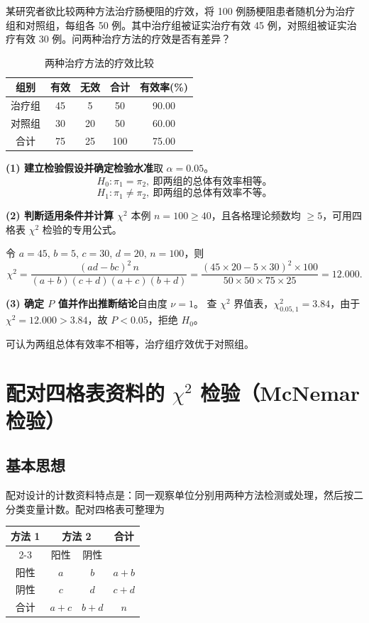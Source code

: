 \documentclass[lang=cn,10pt]{elegantbook}
\begin{document}
\vspace{0.2cm}
\begin{exercise}
某研究者欲比较两种方法治疗肠梗阻的疗效，将 100 例肠梗阻患者随机分为治疗组和对照组，每组各 50 例。其中治疗组被证实治疗有效 45 例，对照组被证实治疗有效 30 例。问两种治疗方法的疗效是否有差异？

\begin{table}[htbp]
\centering
\caption*{两种治疗方法的疗效比较}
\begin{tabular}{ccccc}
  \hline
  组别 & 有效 & 无效 & 合计 & 有效率(\%) \\
  \hline
  治疗组 & 45 & 5  & 50 & 90.00 \\
  对照组 & 30 & 20 & 50 & 60.00 \\
  \hline
  合计 & 75 & 25 & 100 & 75.00 \\
  \hline
\end{tabular}
\end{table}
\end{exercise}

\begin{solution}
\textbf{(1) 建立检验假设并确定检验水准}\quad 取 $\alpha=0.05$。
\[
  H_0:\pi_1=\pi_2,~即两组的总体有效率相等。
\]
\[
H_1:\pi_1\ne\pi_2,~即两组的总体有效率不等。
\]

\textbf{(2) 判断适用条件并计算 $\chi^2$}\quad
本例 $n=100\ge 40$，且各格理论频数均 $\ge 5$，可用四格表 $\chi^2$ 检验的专用公式。

令 $a=45,\,b=5,\,c=30,\,d=20,\,n=100$，则
\[
  \chi^2=\frac{(ad-bc)^2\,n}{(a+b)(c+d)(a+c)(b+d)}
  =\frac{(45\times 20-5\times 30)^2\times 100}{50\times 50\times 75\times 25}=12.000.
\]

\textbf{(3) 确定 $P$ 值并作出推断结论}\quad 自由度 $\nu=1$。
查 $\chi^2$ 界值表，$\chi^2_{0.05,1}=3.84$，由于 $\chi^2=12.000>3.84$，故 $P<0.05$，拒绝 $H_0$。

可认为两组总体有效率不相等，治疗组疗效优于对照组。
\end{solution}
\section{配对四格表资料的 $\chi^2$ 检验（McNemar 检验）}

\subsection{基本思想}
配对设计的计数资料特点是：同一观察单位分别用两种方法检测或处理，然后按二分类变量计数。配对四格表可整理为
\begin{center}
\begin{tabular}{cccc}
  \hline
  \multirow{2}{*}{方法 1} & \multicolumn{2}{c}{方法 2} & \multirow{2}{*}{合计}\\
  \cline{2-3}
  & 阳性 & 阴性 & \\
  \hline
  阳性 & $a$ & $b$ & $a+b$\\
  阴性 & $c$ & $d$ & $c+d$\\
  \hline
  合计 & $a+c$ & $b+d$ & $n$\\
  \hline
\end{tabular}
\end{center}
\end{document}
